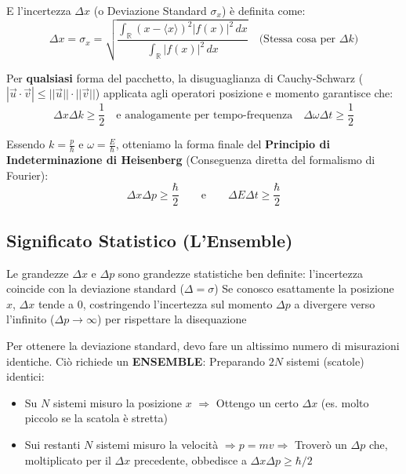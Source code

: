 \documentclass[11pt, a4paper]{article}
\begin{document}
E l'incertezza $\Delta x$ (o Deviazione Standard $\sigma_x$) è definita come: %
\begin{equation}
    \Delta x = \sigma_x = \sqrt{ \frac{\int_{\mathbb{R}} (x - \langle x \rangle)^2 |f(x)|^2 \, dx}{\int_{\mathbb{R}} |f(x)|^2 \, dx} } \quad \text{(Stessa cosa per } \Delta k \text{)} %
\end{equation}

\noindent
Per \textbf{qualsiasi} forma del pacchetto, la disuguaglianza di Cauchy-Schwarz ($|\vec{u} \cdot \vec{v}| \le ||\vec{u}|| \cdot ||\vec{v}||$) applicata agli operatori posizione e momento garantisce che: %
\begin{equation*}
    \Delta x \Delta k \ge \frac{1}{2} \quad \text{e analogamente per tempo-frequenza} \quad \Delta \omega \Delta t \ge \frac{1}{2} %
\end{equation*}

\noindent
Essendo $k = \frac{p}{\hbar}$ e $\omega = \frac{E}{\hbar}$, otteniamo la forma finale del \textbf{Principio di Indeterminazione di Heisenberg} (Conseguenza diretta del formalismo di Fourier): %
\begin{equation}
    \boxed{ \Delta x \Delta p \ge \frac{\hbar}{2} } \qquad \text{e} \qquad \boxed{ \Delta E \Delta t \ge \frac{\hbar}{2} } %
\end{equation}

\subsection{Significato Statistico (L'Ensemble)} %

Le grandezze $\Delta x$ e $\Delta p$ sono grandezze statistiche ben definite: l'incertezza coincide con la deviazione standard ($\Delta = \sigma$) %
Se conosco esattamente la posizione $x$, $\Delta x$ tende a $0$, costringendo l'incertezza sul momento $\Delta p$ a divergere verso l'infinito ($\Delta p \to \infty$) per rispettare la disequazione %

\noindent
Per ottenere la deviazione standard, devo fare un altissimo numero di misurazioni identiche. Ciò richiede un \textbf{ENSEMBLE}:
Preparando $2N$ sistemi (scatole) identici: %
\begin{itemize}
    \item Su $N$ sistemi misuro la posizione $x$ $\Rightarrow$ Ottengo un certo $\Delta x$ (es. molto piccolo se la scatola è stretta) %
    \item Sui restanti $N$ sistemi misuro la velocità $\Rightarrow p = mv \Rightarrow$ Troverò un $\Delta p$ che, moltiplicato per il $\Delta x$ precedente, obbedisce a $\Delta x \Delta p \ge \hbar/2$ %
\end{itemize}
\end{document}
